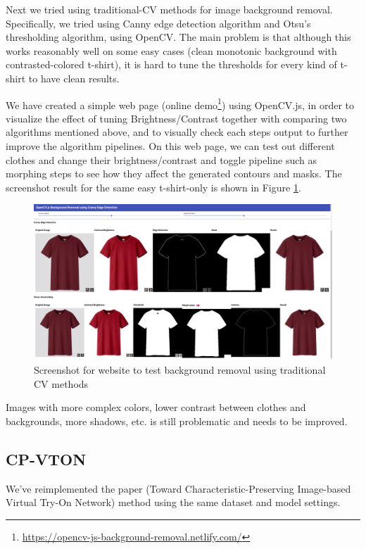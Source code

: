 \documentclass{article}
\begin{document}
Next we tried using traditional-CV methods for image background removal. Specifically, we tried using Canny edge detection algorithm and Otsu's thresholding algorithm, using OpenCV. The main problem is that although this works reasonably well on some easy cases (clean monotonic background with contrasted-colored t-shirt), it is hard to tune the thresholds for every kind of t-shirt to have clean results.

We have created a simple web page\cite{opencvjswebsite} (online demo\footnote{\url{https://opencv-js-background-removal.netlify.com/}}) using OpenCV.js, in order to visualize the effect of tuning Brightness/Contrast together with comparing two algorithms mentioned above, and to visually check each steps output to further improve the algorithm pipelines. On this web page, we can test out different clothes and change their brightness/contrast and toggle pipeline such as morphing steps to see how they affect the generated contours and masks. The screenshot result for the same easy t-shirt-only is shown in Figure \ref{fig:bgrm-cv}.

\begin{figure}[H]
    \centering
    \includegraphics[width=1\textwidth]{rmbg/cv-tshirt.png}
    \caption{Screenshot for website\cite{opencvjswebsite} to test background removal using traditional CV methods}
    \label{fig:bgrm-cv}
\end{figure}

Images with more complex colors, lower contrast between clothes and backgrounds, more shadows, etc. is still problematic and needs to be improved.

\subsection{CP-VTON}
We've reimplemented the paper (Toward Characteristic-Preserving Image-based Virtual Try-On Network) method using the same dataset and model settings.
\end{document}
